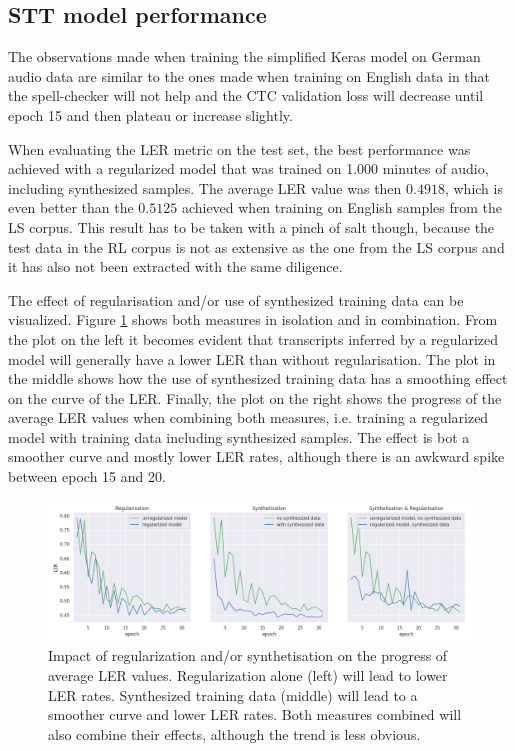 \subsection{\ac{STT} model performance}

The observations made when training the simplified Keras model on German audio data are similar to the ones made when training on English data in that the spell-checker will not help and the CTC validation loss will decrease until epoch 15 and then plateau or increase slightly.

When evaluating the \ac{LER} metric on the test set, the best performance was achieved with a regularized model that was trained on 1.000 minutes of audio, including synthesized samples. The average \ac{LER} value was then $0.4918$, which is even better than the $0.5125$ achieved when training on English samples from the \ac{LS} corpus. This result has to be taken with a pinch of salt though, because the test data in the \ac{RL} corpus is not as extensive as the one from the \ac{LS} corpus and it has also not been extracted with the same diligence. 

The effect of regularisation and/or use of synthesized training data can be visualized. Figure \ref{regularization_synthetisation} shows both measures in isolation and in combination. From the plot on the left it becomes evident that transcripts inferred by a regularized model will generally have a lower \ac{LER} than without regularisation. The plot in the middle shows how the use of synthesized training data has a smoothing effect on the curve of the \ac{LER}. Finally, the plot on the right shows the progress of the average \ac{LER} values when combining both measures, i.e. training a regularized model with training data including synthesized samples. The effect is bot a smoother curve and mostly lower \ac{LER} rates, although there is an awkward spike between epoch 15 and 20.

\begin{figure}[h!]
	\includegraphics[width=\linewidth]{./img/regularization_synthetisation.png}
	\caption{Impact of regularization and/or synthetisation on the progress of average \ac{LER} values. Regularization alone (left) will lead to lower \ac{LER} rates. Synthesized training data (middle) will lead to a smoother curve and lower \ac{LER} rates. Both measures combined will also combine their effects, although the trend is less obvious.}
	\label{regularization_synthetisation}
\end{figure}

